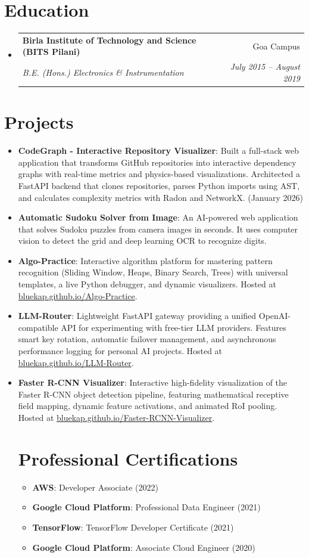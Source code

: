 \documentclass[a4paper,20pt]{article}
\makeatletter
\newcommand{\resumeItem}[2]{
  \item\small{
    \textbf{#1}{: #2 \vspace{-2pt}}
  }
}
\newcommand{\resumeSubheading}[4]{
  \vspace{-1pt}\item
    \begin{tabular*}{0.97\textwidth}{l@{\extracolsep{\fill}}r}
      \textbf{#1} & #2 \\
      \textit{#3} & \textit{#4} \\
    \end{tabular*}\vspace{-5pt}
}
\newcommand{\resumeSubItem}[2]{\resumeItem{#1}{#2}\vspace{-3pt}}
\newcommand{\resumeSubHeadingListStart}{\begin{itemize}[leftmargin=*]}
\newcommand{\resumeSubHeadingListEnd}{\end{itemize}}
\makeatother
\begin{document}
\vspace{-5pt}
\section{Education}
\resumeSubHeadingListStart
\resumeSubheading
  {Birla Institute of Technology and Science (BITS Pilani)}{Goa Campus}
  {B.E. (Hons.) Electronics \& Instrumentation}{July 2015 -- August 2019}
\resumeSubHeadingListEnd

\vspace{-5pt}
\section{Projects}
\resumeSubHeadingListStart
\resumeSubItem{CodeGraph - Interactive Repository Visualizer}{
Built a full-stack web application that transforms GitHub repositories into interactive dependency graphs with real-time metrics and physics-based visualizations. Architected a FastAPI backend that clones repositories, parses Python imports using AST, and calculates complexity metrics with Radon and NetworkX. (January 2026)}
\resumeSubItem{Automatic Sudoku Solver from Image}
{An AI-powered web application that solves Sudoku puzzles from camera images in seconds. It uses computer vision to detect the grid and deep learning OCR to recognize digits.}
\resumeSubItem{Algo-Practice}
{Interactive algorithm platform for mastering pattern recognition (Sliding Window, Heaps, Binary Search, Trees) with universal templates, a live Python debugger, and dynamic visualizers. Hosted at \href{https://bluekap.github.io/Algo-Practice}{bluekap.github.io/Algo-Practice}.}
\resumeSubItem{LLM-Router}
{Lightweight FastAPI gateway providing a unified OpenAI-compatible API for experimenting with free-tier LLM providers. Features smart key rotation, automatic failover management, and asynchronous performance logging for personal AI projects. Hosted at \href{https://bluekap.github.io/LLM-Router}{bluekap.github.io/LLM-Router}.}
\resumeSubItem{Faster R-CNN Visualizer}
{Interactive high-fidelity visualization of the Faster R-CNN object detection pipeline, featuring mathematical receptive field mapping, dynamic feature activations, and animated RoI pooling. Hosted at \href{https://bluekap.github.io/Faster-RCNN-Visualizer}{bluekap.github.io/Faster-RCNN-Visualizer}.}
\vspace{2pt}


\vspace{-5pt}
\section{Professional Certifications}
\resumeSubHeadingListStart
\resumeSubItem{AWS}{Developer Associate (2022)}
\resumeSubItem{Google Cloud Platform}{Professional Data Engineer (2021)}
\resumeSubItem{TensorFlow}{TensorFlow Developer Certificate (2021)}
\resumeSubItem{Google Cloud Platform}{Associate Cloud Engineer (2020)}
\resumeSubHeadingListEnd
\resumeSubHeadingListEnd
\end{document}

